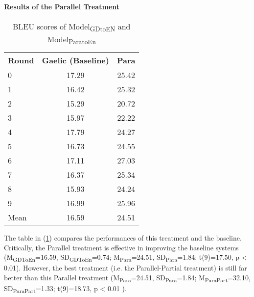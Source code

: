 \documentclass[a4paper]{article}
\begin{document}
\paragraph{Results of the Parallel Treatment}\label{treatment:Para_result}
\begin{table}[ht]
\centering
\begin{tabular}{lcc}
  \hline
Round & Gaelic (Baseline) & Para \\ 
  \hline
0 & 17.29 & 25.42 \\ 
  1 & 16.42 & 25.32 \\ 
  2 & 15.29 & 20.72 \\ 
  3 & 15.97 & 22.22 \\ 
  4 & 17.79 & 24.27 \\ 
  5 & 16.73 & 24.55 \\ 
  6 & 17.11 & 27.03 \\ 
  7 & 16.37 & 25.34 \\ 
  8 & 15.93 & 24.24 \\ 
  9 & 16.99 & 25.96 \\ 
   \hline
Mean & 16.59 & 24.51 \\ 
   \hline
\end{tabular}
\caption{BLEU scores of Model\textsubscript{GDtoEN} and Model\textsubscript{ParatoEn}} 
\label{Table:Para}
\end{table}The table in (\ref{Table:Para}) compares the performances of this treatment and the baseline. Critically, the Parallel treatment is effective in improving the baseline systems (M\textsubscript{GDToEn}=16.59, SD\textsubscript{GDToEn}=0.74; M\textsubscript{Para}=24.51, SD\textsubscript{Para}=1.84; t(9)=17.50, p < 0.01). 
However, the best treatment (i.e. the Parallel-Partial treatment) is still far better than this Parallel treatment 
(M\textsubscript{Para}=24.51, SD\textsubscript{Para}=1.84; M\textsubscript{ParaPart}=32.10, SD\textsubscript{ParaPart}=1.33; t(9)=18.73, p < 0.01 ).
\end{document}
